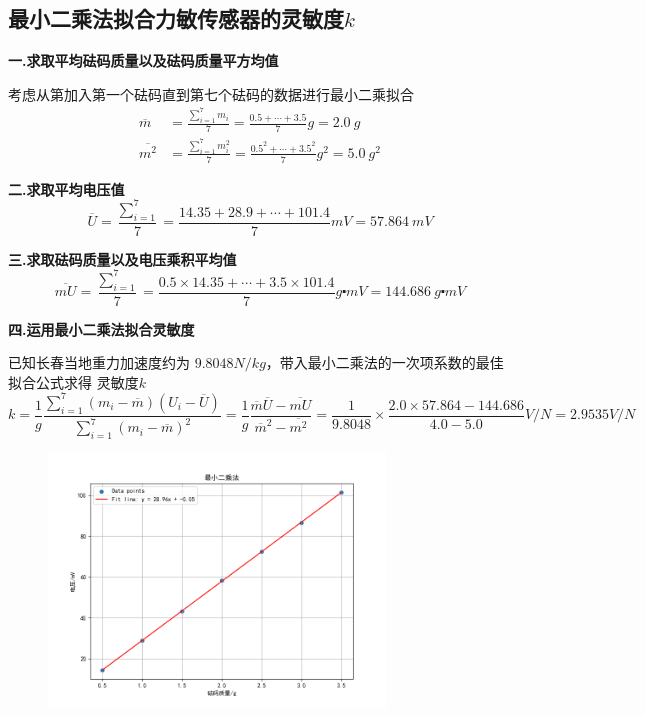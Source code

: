 \documentclass[UTF8]{ctexart}
\begin{document}
\subsection{最小二乘法拟合力敏传感器的灵敏度$k$}
\textbf{一.求取平均砝码质量以及砝码质量平方均值}

考虑从第加入第一个砝码直到第七个砝码的数据进行最小二乘拟合
\begin{align*}
\overline{m} &= \frac{\sum_{i=1}^{7}m_i}{7} = \frac{0.5+\cdots + 3.5 }{7} g= 2.0 \  g \\
 \overline{m^2} &= \frac{\sum_{i=1}^{7}m_i^2}{7} = \frac{0.5^2+\cdots + 3.5^2 }{7} g^2= 5.0 \  g^2
\end{align*}

  \textbf{二.求取平均电压值}
$$\overline{U} = \frac{\sum_{i=1}^{7}}{7} = \frac{14.35+28.9+\cdots+101.4}{7} mV= 57.864 \  mV$$

\textbf{三.求取砝码质量以及电压乘积平均值}
$$\overline{mU} = \frac{\sum_{i=1}^{7}}{7} = \frac{0.5\times14.35+\cdots+3.5\times101.4}{7}g\centerdot mV = 144.686 \  g \centerdot mV$$

\textbf{四.运用最小二乘法拟合灵敏度}

  已知长春当地重力加速度约为 $9.8048 N/kg$，带入最小二乘法的一次项系数的最佳拟合公式求得 灵敏度$k$ 
$$k = \frac{1}{g}\frac{\sum_{i=1}^{7}(m_i-\overline{m})(U_i-\overline{U})}{\sum_{i=1}^{7}(m_i-\overline{m})^2} =\frac{1}{g} \frac{\overline{m}\overline{U}-\overline{mU}}{\overline{m}^2-\overline{m^2}} = \frac{1}{9.8048}\times \frac{2.0\times57.864 - 144.686}{4.0-5.0} V/N = 2.9535 V/N$$



\begin{figure}[H]  %
		\centering
		\includegraphics[width=0.8\textwidth,height=0.5\textwidth]{img/photo.png}
		\label{fig:side:b} 
    \end{figure}
\end{document}
